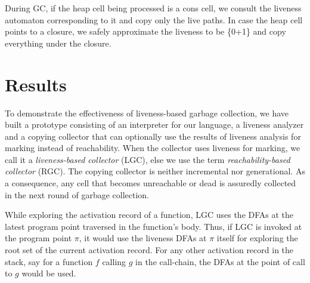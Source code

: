 \documentclass[9pt]{sigplanconf}
\newcommand{\comment}[1]{{\color{Myblue}{(#1)}}}
\begin{document}

\comment{Mention the fact that liveness at a program point indicates
  what references will be used by the program eventually. The exact
  point where a reference will be used cannot be determined statically
due to the language being lazy. }
During GC, if the heap cell being processed is a cons cell, we consult
the  liveness automaton  corresponding to  it and  copy only  the live
paths.  In  case  the  heap  cell  points  to  a  closure,  we  safely
approximate the  liveness to be {\{0+1\}\*} and  copy everything under
the closure.






\section{Results}
To demonstrate the effectiveness of liveness-based garbage collection,
we  have  built a  prototype  consisting  of  an interpreter  for  our
language,  a  liveness  analyzer  and  a copying  collector  that  can
optionally use the results of liveness analysis for marking instead of
reachability. When the collector uses liveness for marking, we call it
a  {\em liveness-based  collector} (LGC),  else we  use the  term {\em
  reachability-based  collector}  (RGC).   The  copying  collector  is
neither incremental nor generational.  As a consequence, any cell that
becomes unreachable or  dead is assuredly collected in  the next round
of garbage collection.

While exploring the activation record of a function, LGC uses the DFAs
at  the latest  program  point traversed  in the function's body.
Thus, if  LGC
is invoked  at the program point   $\pi$,  it would  use  the
liveness  DFAs at  $\pi$ itself for exploring the root set of the
current activation record. For any other activation record in the
stack, say for a function ${\mathit f}$ calling ${\mathit g}$ in the
call-chain,
the DFAs at the point of call to  ${\mathit g}$ would be used.
\end{document}
